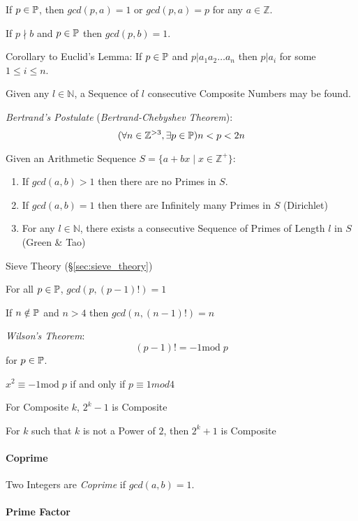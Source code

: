 If $p \in \mathbb{P}$, then $gcd(p,a) = 1$ or $gcd(p,a) = p$ for any
$a \in \mathbb{Z}$.

If $p \nmid b$ and $p \in \mathbb{P}$ then $gcd (p,b) = 1$.

Corollary to Euclid's Lemma: If $p \in \mathbb{P}$ and $p|a_1 a_2
\ldots a_n$ then $p|a_i$ for some $1 \leq i \leq n$.

Given any $l \in \mathbb{N}$, a Sequence of $l$ consecutive Composite
Numbers may be found.

\emph{Bertrand's Postulate} (\emph{Bertrand-Chebyshev Theorem}):
\[
  (\forall n \in \mathbb{Z}^{>3}, \exists p \in \mathbb{P}) n < p < 2n
\]

Given an Arithmetic Sequence $S = \{ a + bx \;|\; x \in \mathbb{Z}^+\}$:
\begin{enumerate}
  \item If $gcd(a,b) > 1$ then there are no Primes in $S$.
  \item If $gcd(a,b) = 1$ then there are Infinitely many Primes in $S$
    (Dirichlet)
  \item For any $l \in \mathbb{N}$, there exists a consecutive
    Sequence of Primes of Length $l$ in $S$ (Green \& Tao)
\end{enumerate}

Sieve Theory (\S\ref{sec:sieve_theory})

For all $p \in \mathbb{P}$, $gcd(p, (p-1)!) = 1$

If $n \notin \mathbb{P}$ and $n > 4$ then $gcd(n,(n-1)!) = n$

\emph{Wilson's Theorem}:
\[
  (p - 1)! = -1 \mathrm{mod}\;p
\]
for $p \in \mathbb{P}$.

$x^2 \equiv -1 \mathrm{mod}\;p$ if and only if $p \equiv 1 mod 4$

For Composite $k$, $2^k-1$ is Composite

For $k$ such that $k$ is not a Power of $2$, then $2^k+1$ is Composite



\paragraph{Coprime}\label{sec:coprime}\hfill

Two Integers are \emph{Coprime} if $gcd (a,b) = 1$.



\paragraph{Prime Factor}\label{sec:prime_factor}\hfill

